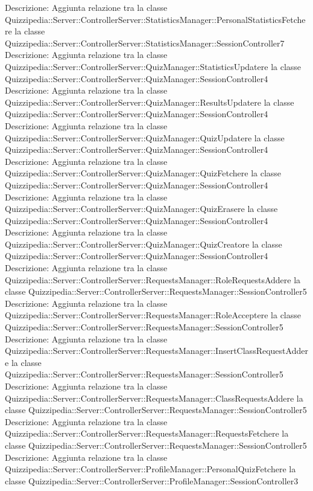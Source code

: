 Descrizione: Aggiunta relazione tra la classe Quizzipedia::Server::ControllerServer::StatisticsManager::PersonalStatisticsFetchere la classe Quizzipedia::Server::ControllerServer::StatisticsManager::SessionController7 
Descrizione: Aggiunta relazione tra la classe Quizzipedia::Server::ControllerServer::QuizManager::StatisticsUpdatere la classe Quizzipedia::Server::ControllerServer::QuizManager::SessionController4 
Descrizione: Aggiunta relazione tra la classe Quizzipedia::Server::ControllerServer::QuizManager::ResultsUpdatere la classe Quizzipedia::Server::ControllerServer::QuizManager::SessionController4 
Descrizione: Aggiunta relazione tra la classe Quizzipedia::Server::ControllerServer::QuizManager::QuizUpdatere la classe Quizzipedia::Server::ControllerServer::QuizManager::SessionController4 
Descrizione: Aggiunta relazione tra la classe Quizzipedia::Server::ControllerServer::QuizManager::QuizFetchere la classe Quizzipedia::Server::ControllerServer::QuizManager::SessionController4 
Descrizione: Aggiunta relazione tra la classe Quizzipedia::Server::ControllerServer::QuizManager::QuizErasere la classe Quizzipedia::Server::ControllerServer::QuizManager::SessionController4 
Descrizione: Aggiunta relazione tra la classe Quizzipedia::Server::ControllerServer::QuizManager::QuizCreatore la classe Quizzipedia::Server::ControllerServer::QuizManager::SessionController4 
Descrizione: Aggiunta relazione tra la classe Quizzipedia::Server::ControllerServer::RequestsManager::RoleRequestsAddere la classe Quizzipedia::Server::ControllerServer::RequestsManager::SessionController5 
Descrizione: Aggiunta relazione tra la classe Quizzipedia::Server::ControllerServer::RequestsManager::RoleAcceptere la classe Quizzipedia::Server::ControllerServer::RequestsManager::SessionController5 
Descrizione: Aggiunta relazione tra la classe Quizzipedia::Server::ControllerServer::RequestsManager::InsertClassRequestAddere la classe Quizzipedia::Server::ControllerServer::RequestsManager::SessionController5 
Descrizione: Aggiunta relazione tra la classe Quizzipedia::Server::ControllerServer::RequestsManager::ClassRequestsAddere la classe Quizzipedia::Server::ControllerServer::RequestsManager::SessionController5 
Descrizione: Aggiunta relazione tra la classe Quizzipedia::Server::ControllerServer::RequestsManager::RequestsFetchere la classe Quizzipedia::Server::ControllerServer::RequestsManager::SessionController5 
Descrizione: Aggiunta relazione tra la classe Quizzipedia::Server::ControllerServer::ProfileManager::PersonalQuizFetchere la classe Quizzipedia::Server::ControllerServer::ProfileManager::SessionController3 
